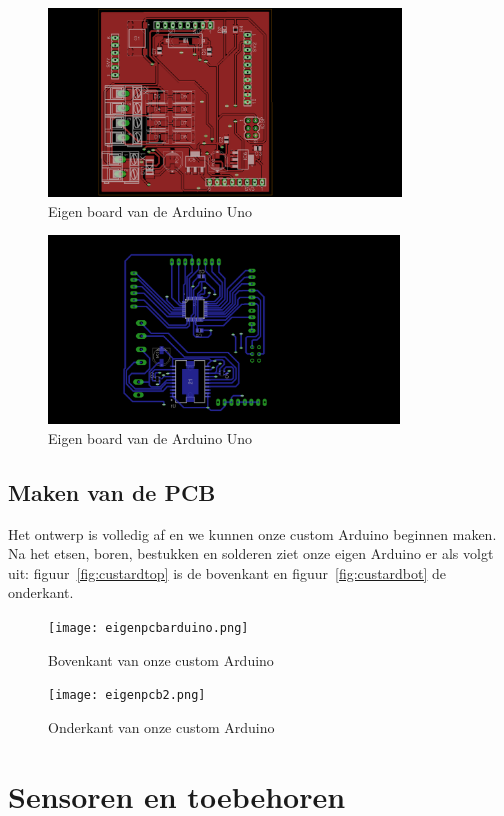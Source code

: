 \begin{figure}[H]
	\centering
	\includegraphics[height=5cm]{topboard.png}
	\caption{Eigen board van de Arduino Uno\label{fig:topboard}}
\end{figure}

\begin{figure}[H]
	\centering
	\includegraphics[height=5cm]{bottomboard.png}
	\caption{Eigen board van de Arduino Uno\label{fig:bottomboard}}
\end{figure}
\subsection{Maken van de PCB}
Het ontwerp is volledig af en we kunnen onze custom Arduino beginnen maken. Na het etsen, boren, bestukken en solderen ziet onze eigen Arduino er als volgt uit: figuur~\vref{fig:custardtop} is de bovenkant en figuur~\vref{fig:custardbot} de onderkant.

\begin{figure}[H]
	\centering
	\texttt{[image: eigenpcbarduino.png]}
	\caption{Bovenkant van onze custom Arduino\label{fig:custardtop}}
\end{figure}

\begin{figure}[H]
	\centering
	\texttt{[image: eigenpcb2.png]}
	\caption{Onderkant van onze custom Arduino\label{fig:custardbot}}
\end{figure}



 
\section{Sensoren en toebehoren}
